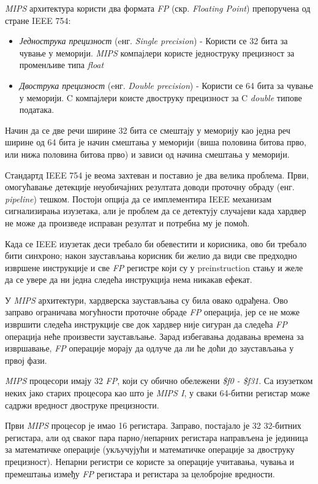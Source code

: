\documentclass[12pt,oneside]{memoir}
\begin{document}
\textit{MIPS} архитектура користи два формата \textit{FP} (скр. \textit{Floating Point}) препоручена од стране IEEE 754:

\begin{itemize}
	\item \textit{Једнострука прецизност} (eнг. \textit{Single precision}) - Користи се 32 бита за чување у меморији. \textit{MIPS} компајлери користе једноструку прецизност за променљиве типа \textit{float}
	\item \textit{Двострука прецизност} (eнг. \textit{Double precision}) - Користи се 64 бита за чување у меморији. C компајлери коисте двоструку прецизност за C \textit{double} типове података.
\end{itemize}

\indent Начин да се две речи ширине 32 бита се смештају у меморију као једна реч ширине од 64 бита је начин смештања у меморији (виша половина битова прво, или нижа половина битова прво) и зависи од начина смештања у меморији. 

\indent Стандартд IEEE 754 је веома захтеван и поставио је два велика проблема. Први, омогућавање детекције неуобичајних резултата доводи проточну обраду (енг. \textit{pipeline}) тешком. Постоји опција да се имплементира IEEE механизам сигнализирања изузетака, али је проблем да се детектују случајеви када хардвер не може да произведе исправан резултат и потребна му је помоћ.

\indent Када се IEEE изузетак деси требало би обевестити и корисника, ово би требало бити синхроно; након заустављања корисник би желио да види све предходно извршене инструкције и све \textit{FP} регистре који су у preinstruction стању и желе да се увере да ни једна следећа инструкција нема никакав ефекат.

\indent У \textit{MIPS} архитектури, хардверска заустављања су била овако одрађена. Ово заправо ограничава могућности проточне обраде \textit{FP} операција, јер се не може извршити следећа инструкције све док хардвер није сигуран да следећа \textit{FP} операција неће произвести заустављање. Зарад избегавања додавања времена за извршавање, \textit{FP} операције морају да одлуче да ли ће доћи до заустављања у првој фази. 

\indent \textit{MIPS} процесори имају 32 \textit{FP}, који су обично обележени \textit{\$f0 - \$f31}. Са изузетком неких јако старих процесора као што је \textit{MIPS I}, у сваки 64-битни регистар може садржи вредност двоструке прецизности.

\indent Први \textit{MIPS} процесор је имао 16 регистара. Заправо, постајало је 32 32-битних регистара, али од сваког пара парно/непарних регистара направљена је јединица за математичке операције (укључујући и математичке операције за двоструку прецизност). Непарни регистри се користе за операције учитавања, чувања и премештања између \textit{FP} регистара и регистара за целобројне вредности.
\end{document}
